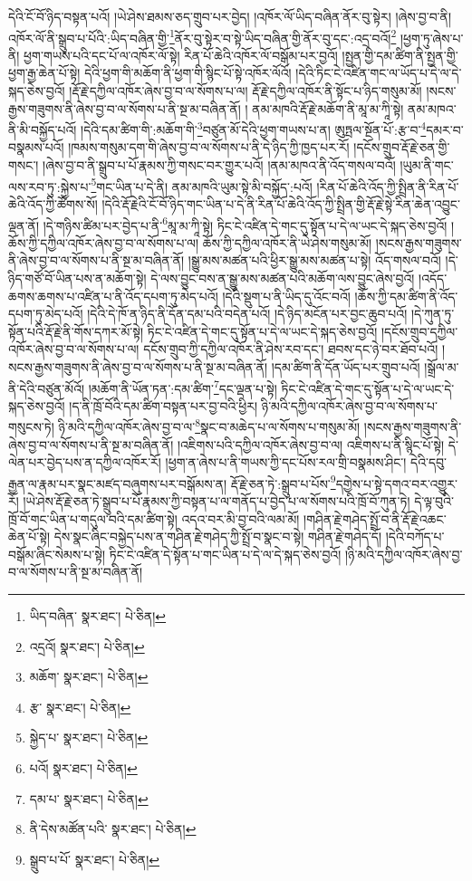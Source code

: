 དེའི་ངོ་བོ་ཉིད་བསྟན་པའོ། །ཡེ་ཤེས་ཐམས་ཅད་གྲུབ་པར་བྱེད། །འཁོར་ལོ་ཡིད་བཞིན་ནོར་བུ་སྟེར། །ཞེས་བྱ་བ་ནི། འཁོར་ལོ་ནི་སྒྲུབ་པ་པོའི་:ཡིད་བཞིན་གྱི་\footnote{ཡིད་བཞིན་  སྣར་ཐང་།  པེ་ཅིན། }ནོར་བུ་སྟེར་བ་སྟེ་ཡིད་བཞིན་གྱི་ནོར་བུ་དང་:འདྲ་བའོ།\footnote{འདྲའོ།  སྣར་ཐང་།  པེ་ཅིན། } །ཕྱག་ཏུ་ཞེས་པ་ནི། ཕྱག་གཡས་པའི་དང་པོ་ལ་འཁོར་ལོ་སྟེ། རིན་པོ་ཆེའི་འཁོར་ལོ་བསྒོམ་པར་བྱའོ། །སྤྱན་གྱི་དམ་ཚིག་ནི་སྤྱན་གྱི་ཕྱག་རྒྱ་ཆེན་པོ་སྟེ། དེའི་ཕྱག་གི་མཆོག་ནི་ཕྱག་གི་སྙིང་པོ་སྟེ་འཁོར་ལོའོ། །དེའི་ཏིང་ངེ་འཛིན་གང་ལ་ཡོད་པ་དེ་ལ་དེ་སྐད་ཅེས་བྱའོ། །རྡོ་རྗེ་དཀྱིལ་འཁོར་ཞེས་བྱ་བ་ལ་སོགས་པ་ལ། རྡོ་རྗེ་དཀྱིལ་འཁོར་ནི་སྟོང་པ་ཉིད་གསུམ་མོ། །སངས་རྒྱས་གཟུགས་ནི་ཞེས་བྱ་བ་ལ་སོགས་པ་ནི་སྔ་མ་བཞིན་ནོ། །
ནམ་མཁའི་རྡོ་རྗེ་མཆོག་ནི་མཱ་མ་ཀཱི་སྟེ། ནམ་མཁའ་ནི་མི་བསྐྱོད་པའོ། །དེའི་དམ་ཚིག་གི་:མཆོག་གི་\footnote{མཆོག་  སྣར་ཐང་།  པེ་ཅིན། }བཙུན་མོ་དེའི་ཕྱག་གཡས་པ་ན། ཨུཏྤལ་སྔོན་པོ་:རྩ་བ་\footnote{རྩ་  སྣར་ཐང་།  པེ་ཅིན། }དམར་བ་བསྣམས་པའོ། །ཁམས་གསུམ་དག་གི་ཞེས་བྱ་བ་ལ་སོགས་པ་ནི་དེ་ཉིད་ཀྱི་ཁྱད་པར་རོ། །དངོས་གྲུབ་རྡོ་རྗེ་ཅན་གྱི་གསང་། །ཞེས་བྱ་བ་ནི་སྒྲུབ་པ་པོ་རྣམས་ཀྱི་གསང་བར་གྱུར་པའོ། །ནམ་མཁའ་ནི་འོད་གསལ་བའོ། །ཡུམ་ནི་གང་ལས་རབ་ཏུ་:སྐྱེས་པ་\footnote{སྐྱེད་པ་  སྣར་ཐང་།  པེ་ཅིན། }གང་ཡིན་པ་དེ་ནི། ནམ་མཁའི་ཡུམ་སྟེ་མི་བསྐྱོད་:པའོ། །རིན་པོ་ཆེའི་འོད་ཀྱི་སྤྲིན་ནི་རིན་པོ་ཆེའི་འོད་ཀྱི་ཚོགས་སོ། །དེའི་རྡོ་རྗེའི་ངོ་བོ་ཉིད་གང་ཡིན་པ་དེ་ནི་རིན་པོ་ཆེའི་འོད་ཀྱི་སྤྲིན་གྱི་རྡོ་རྗེ་སྟེ་རིན་ཆེན་འབྱུང་ལྡན་ནོ། །དེ་གཉིས་ཚིམ་པར་བྱེད་པ་ནི་\footnote{པའོ།   སྣར་ཐང་།  པེ་ཅིན། }མཱ་མ་ཀཱི་སྟེ། ཏིང་ངེ་འཛིན་དེ་གང་དུ་སྟོན་པ་དེ་ལ་ཡང་དེ་སྐད་ཅེས་བྱའོ། །ཆོས་ཀྱི་དཀྱིལ་འཁོར་ཞེས་བྱ་བ་ལ་སོགས་པ་ལ། ཆོས་ཀྱི་དཀྱིལ་འཁོར་ནི་ཡེ་ཤེས་གསུམ་མོ། །སངས་རྒྱས་གཟུགས་ནི་ཞེས་བྱ་བ་ལ་སོགས་པ་ནི་སྔ་མ་བཞིན་ནོ། །སྒྱུ་མས་མཚན་པའི་ཕྱིར་སྒྱུ་མས་མཚན་པ་སྟེ། འོད་གསལ་བའོ། །དེ་ཉིད་གཙོ་བོ་ཡིན་པས་ན་མཆོག་སྟེ། དེ་ལས་བྱུང་བས་ན་སྒྱུ་མས་མཚན་པའི་མཆོག་ལས་བྱུང་ཞེས་བྱའོ། །འདོད་ཆགས་ཆགས་པ་འཛིན་པ་ནི་འོད་དཔག་ཏུ་མེད་པའོ། །དེའི་སྡུག་པ་ནི་ཡིད་དུ་འོང་བའོ། །ཆོས་ཀྱི་དམ་ཚིག་ནི་འོད་དཔག་ཏུ་མེད་པའོ། །དེའི་དེ་ཁོ་ན་ཉིད་ནི་དོན་དམ་པའི་བདེན་པའོ། །དེ་ཉིད་མངོན་པར་བྱང་ཆུབ་པའོ། །དེ་ཀུན་ཏུ་སྟོན་པའི་རྡོ་རྗེ་ནི་གོས་དཀར་མོ་སྟེ། ཏིང་ངེ་འཛིན་དེ་གང་དུ་སྟོན་པ་དེ་ལ་ཡང་དེ་སྐད་ཅེས་བྱའོ། །དངོས་གྲུབ་དཀྱིལ་འཁོར་ཞེས་བྱ་བ་ལ་སོགས་པ་ལ། དངོས་གྲུབ་ཀྱི་དཀྱིལ་འཁོར་ནི་ཤེས་རབ་དང་། ཐབས་དང་ཉེ་བར་ཐོབ་པའོ། །སངས་རྒྱས་གཟུགས་ནི་ཞེས་བྱ་བ་ལ་སོགས་པ་ནི་སྔ་མ་བཞིན་ནོ། །དམ་ཚིག་ནི་དོན་ཡོད་པར་གྲུབ་པའོ། །སྒྲོལ་མ་ནི་དེའི་བཙུན་མོའོ། །མཆོག་ནི་ཡོན་ཏན་:དམ་ཚིག་\footnote{དམ་པ་  སྣར་ཐང་།  པེ་ཅིན། }དང་ལྡན་པ་སྟེ། ཏིང་ངེ་འཛིན་དེ་གང་དུ་སྟོན་པ་དེ་ལ་ཡང་དེ་སྐད་ཅེས་བྱའོ། །ད་ནི་ཁྲོ་བོའི་དམ་ཚིག་བསྟན་པར་བྱ་བའི་ཕྱིར། ཉི་མའི་དཀྱིལ་འཁོར་ཞེས་བྱ་བ་ལ་སོགས་པ་གསུངས་ཏེ། ཉི་མའི་དཀྱིལ་འཁོར་ཞེས་བྱ་བ་ལ་\footnote{ནི་དེས་མཚོན་པའི་  སྣར་ཐང་།  པེ་ཅིན། }སྣང་བ་མཆེད་པ་ལ་སོགས་པ་གསུམ་མོ། །སངས་རྒྱས་གཟུགས་ནི་ཞེས་བྱ་བ་ལ་སོགས་པ་ནི་སྔ་མ་བཞིན་ནོ། །འཇིགས་པའི་དཀྱིལ་འཁོར་ཞེས་བྱ་བ་ལ། འཇིགས་པ་ནི་སྙིང་པོ་སྟེ། དེ་ལེན་པར་བྱེད་པས་ན་དཀྱིལ་འཁོར་རོ། །ཕྱག་ན་ཞེས་པ་ནི་གཡས་ཀྱི་དང་པོས་རལ་གྲི་བསྣམས་ཤིང་། དེའི་དབུ་རྒྱན་ལ་རྣམ་པར་སྣང་མཛད་བཞུགས་པར་བསྒོམས་ན། རྡོ་རྗེ་ཅན་ཏེ་:སྒྲུབ་པ་པོས་\footnote{སྒྲུབ་པ་པོ་  སྣར་ཐང་།  པེ་ཅིན། }དགྱེས་པ་སྟེ་དགའ་བར་འགྱུར་རོ། །ཡེ་ཤེས་རྡོ་རྗེ་ཅན་ཏེ་སྒྲུབ་པ་པོ་རྣམས་ཀྱི་བསྟན་པ་ལ་གནོད་པ་བྱེད་པ་ལ་སོགས་པའི་ཁྲོ་བོ་ཀུན་ཏེ། དེ་ལྟ་བུའི་ཁྲོ་བོ་གང་ཡིན་པ་གདུལ་བའི་དམ་ཚིག་སྟེ། འདའ་བར་མི་བྱ་བའི་ལམ་མོ། །གཤིན་རྗེ་གཤེད་སྤྲོ་བ་ནི་རྡོ་རྗེ་འཆང་ཆེན་པོ་སྟེ། དེས་སྣང་ཞིང་བསྐྱེད་པས་ན་གཤིན་རྗེ་གཤེད་ཀྱི་སྤྲོ་བ་སྣང་བ་སྟེ། གཤིན་རྗེ་གཤེད་དོ། །དེའི་བཀོད་པ་བསྒོམ་ཞིང་སེམས་པ་སྟེ། ཏིང་ངེ་འཛིན་དེ་སྟོན་པ་གང་ཡིན་པ་དེ་ལ་དེ་སྐད་ཅེས་བྱའོ། །ཉི་མའི་དཀྱིལ་འཁོར་ཞེས་བྱ་བ་ལ་སོགས་པ་ནི་སྔ་མ་བཞིན་ནོ། 